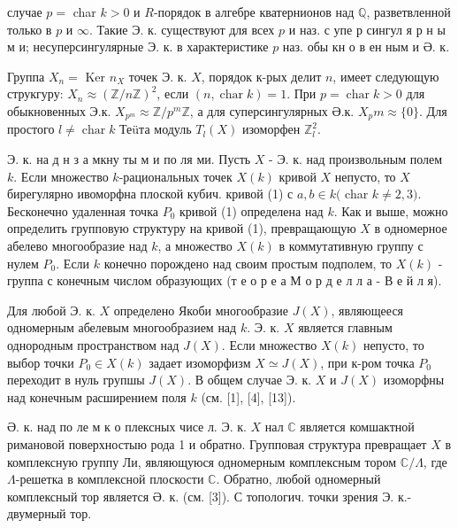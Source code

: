 \documentclass[10pt]{article}
\begin{document}
случае $p=$ char $k>0$ и $R$-порядок в алгебре кватернионов над $\mathbb{Q}$, разветвленной только в $p$ и $\infty$. Такие Э. к. существуют для всех $p$ и наз. с упе р сингул я р н ы м и; несуперсингулярные Э. к. в характеристике $p$ наз. обы кн о в ен ным и Ә. к.



Группа $X_{n}=$ Ker $n_{X}$ точек Э. к. $X$, порядок к-рых делит $n$, имеет следующую струкгуру: $X_{n} \approx(\mathbb{Z} / n \mathbb{Z})^{2}$, если $(n, \operatorname{char} k)=1$. При $p=\operatorname{char} k>0$ для обыкновенных Э.к. $X_{p^{m}} \approx \mathbb{Z} / p^{m} \mathbb{Z}$, а для суперсингулярных Ә.к. $X_{p} m \approx\{0\}$. Для простого $l \neq \operatorname{char} k$ Теüта модуль $T_{l}(X)$ изоморфен $\mathbb{Z}_{l}^{2}$.



Э. к. на д н з а мкну ты м и по ля ми. Пусть $X$ - Э. к. над произвольным полем $k$. Если множество $k$-рациональных точек $X(k)$ кривой $X$ непусто, то $X$ бирегулярно ивоморфна плоской кубич. кривой (1) с $a, b \in k($ char $k \neq 2,3)$. Бесконечно удаленная точка $P_{0}$ кривой (1) определена над $k$. Как и выше, можно определить групповую структуру на кривой (1), превращающую $X$ в одномерное абелево многообразие над $k$, а множество $X(k)$ в коммутативную группу с нулем $P_{0}$. Если $k$ конечно порождено над своим простым подполем, то $X(k)$ - группа с конечным числом образующих (т е о р е а М о р д е л л а - В е й л я).



Для любой Э. к. $X$ определено Якоби многообразие $J(X)$, являющееся одномерным абелевым многообразием над $k$. Э. к. $X$ является главным однородным пространством над $J(X)$. Если множество $X(k)$ непусто, то выбор точки $P_{0} \in X(k)$ задает изоморфизм $X \simeq J(X)$, при к-ром точка $P_{0}$ переходит в нуль групшы $J(X)$. В общем случае Э. к. $X$ и $J(X)$ изоморфны над конечным расширением поля $k$ (см. [1], [4], [13]).



Ә. к. над по ле м к о плексных чисе л. Э. к. $X$ нал $\mathbb{C}$ является комшактной римановой поверхностыю рода 1 и обратно. Групповая структура превращает $X$ в комплексную группу Ли, являющуюся одномерным комплексным тором $\mathbb{C} / \Lambda$, где $\Lambda$-решетка в комплексной плоскости $\mathbb{C}$. Обратно, любой одномерный комплексный тор является Ә. к. (см. [3]). С топологич. точки зрения Э. к.- двумерный тор.
\end{document}
